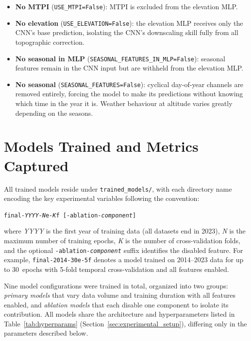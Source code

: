 \begin{itemize}
    \item \textbf{No MTPI} (\texttt{USE\_MTPI=False}): MTPI is excluded from the elevation MLP.
    \item \textbf{No elevation} (\texttt{USE\_ELEVATION=False}): the elevation MLP receives only the CNN's base prediction, isolating the CNN's downscaling skill fully from all topographic correction.
    \item \textbf{No seasonal in MLP} (\texttt{SEASONAL\_FEATURES\_IN\_MLP=False}): seasonal features remain in the CNN input but are withheld from the elevation MLP.
    \item \textbf{No seasonal} (\texttt{SEASONAL\_FEATURES=False}): cyclical day-of-year channels are removed entirely, forcing the model to make its predictions without knowing which time in the year it is. Weather behaviour at altitude varies greatly depending on the seasons.
\end{itemize}

\section{Models Trained and Metrics Captured}
\label{sec:models_trained}

All trained models reside under \texttt{trained\_models/}, with each directory name encoding the key experimental variables following the convention:
%
\begin{center}
\texttt{final-\textit{YYYY}-\textit{N}e-\textit{K}f\,[-ablation-\textit{component}]}
\end{center}
%
\noindent where \textit{YYYY} is the first year of training data (all datasets end in 2023), \textit{N} is the maximum number of training epochs, \textit{K} is the number of cross-validation folds, and the optional \texttt{-ablation-\textit{component}} suffix identifies the disabled feature. For example, \texttt{final-2014-30e-5f} denotes a model trained on 2014--2023 data for up to 30~epochs with 5-fold temporal cross-validation and all features enabled.

Nine model configurations were trained in total, organized into two groups: \textit{primary models} that vary data volume and training duration with all features enabled, and \textit{ablation models} that each disable one component to isolate its contribution. All models share the architecture and hyperparameters listed in Table~\ref{tab:hyperparams} (Section~\ref{sec:experimental_setup}), differing only in the parameters described below.

